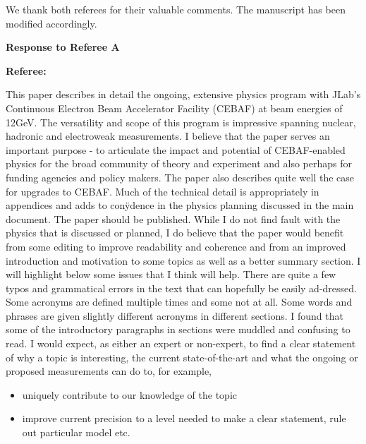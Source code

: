 \documentclass[10pt,aps,prl,amsmath,amssymb,superscriptaddress,nofootinbib,showpacs,preprintnumbers,amsfonts, notitlepage]{revtex4-2}
\begin{document}
We thank both referees for their valuable comments. The manuscript has been    modified accordingly. 

\vskip 10pt 

{\bf Response to Referee A} 

\vskip 10pt 
{\bf Referee: } 

This paper describes in detail the ongoing, extensive physics program with JLab’s Continuous Electron Beam Accelerator Facility (CEBAF) at beam energies of 12GeV. The versatility and scope of this program is impressive spanning nuclear, hadronic and electroweak measurements.
I believe that the paper serves an important purpose - to articulate the impact and potential of CEBAF-enabled physics for the broad community of theory and experiment and also perhaps for funding agencies and policy makers. The paper also describes quite well the case for upgrades to CEBAF. Much of the technical detail is appropriately in appendices and adds to conÿdence in the physics planning discussed in the main document.
The paper should be published. While I do not find fault with the physics that is discussed or planned, I do believe that the paper would benefit  from some editing to improve readability and coherence and from an improved introduction and motivation to some topics as well as a better summary section. I will highlight below some issues that I think will help.
There are quite a few typos and grammatical errors in the text that can hopefully be easily ad-dressed.
Some acronyms are defined  multiple times and some not at all. Some words and phrases are given slightly different  acronyms in 
 different sections.
I found that some of the introductory paragraphs in sections were muddled and confusing to read. I would expect, as either an expert or non-expert, to find a clear statement of why a topic is interesting, the current state-of-the-art and what the ongoing or proposed measurements can do to, for example,

\begin{itemize} 
\item uniquely contribute to our knowledge of the topic

\item improve current precision to a level needed to make a clear statement, rule out particular model etc.

\end{itemize} 
\end{document}
